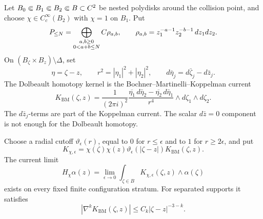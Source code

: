 \begin{thm}
\label{thm:app-finite-window-bmk-current-transfer}
  Let
  \(B_0\Subset B_1\Subset B_2\Subset B\subset C^2\) be nested
  polydisks around the collision point, and choose
  \(\chi\in C_c^\infty(B_2)\) with \(\chi=1\) on \(B_1\).  Put
  \[
    P_{\leq N}
      =
      \bigoplus_{\substack{a,b\geq0\\0<a+b\leq N}}C\rho_{a,b},
      \qquad
    \rho_{a,b}=z_1^{-a-1}z_2^{-b-1}\,dz_1dz_2 .
  \]
  On \((B_\zeta\times B_z)\setminus\Delta\), set
  \[
    \eta=\zeta-z,\qquad
    r^2=|\eta_1|^2+|\eta_2|^2,\qquad
    d\bar\eta_j=d\bar\zeta_j-d\bar z_j .
  \]
  The Dolbeault homotopy kernel is the
  Bochner--Martinelli--Koppelman current
  \[
    K_{\mathrm{BM}}(\zeta,z)
    =
    \frac{1}{(2\pi i)^2}
    \frac{
      \overline{\eta_1}\,d\bar\eta_2
      -
      \overline{\eta_2}\,d\bar\eta_1
    }{r^4}
    \wedge d\zeta_1\wedge d\zeta_2 .
  \]
  The \(d\bar z_j\)-terms are part of the Koppelman current.  The
  scalar \(d\bar z=0\) component is not enough for the Dolbeault
  homotopy.

  Choose a radial cutoff \(\vartheta_\epsilon(r)\), equal to \(0\) for
  \(r\leq\epsilon\) and to \(1\) for \(r\geq2\epsilon\), and put
  \[
    K_{\chi,\epsilon}
      =
      \chi(\zeta)\chi(z)\vartheta_\epsilon(|\zeta-z|)
      K_{\mathrm{BM}}(\zeta,z).
  \]
  The current limit
  \[
    H_\chi\alpha(z)
      =
      \lim_{\epsilon\to0}
      \int_{\zeta\in B}K_{\chi,\epsilon}(\zeta,z)\wedge\alpha(\zeta)
  \]
  exists on every fixed finite configuration stratum.  For separated
  supports it satisfies
  \[
    |\nabla^kK_{\mathrm{BM}}(\zeta,z)|
      \leq C_k|\zeta-z|^{-3-k}.
  \]


\end{thm}

